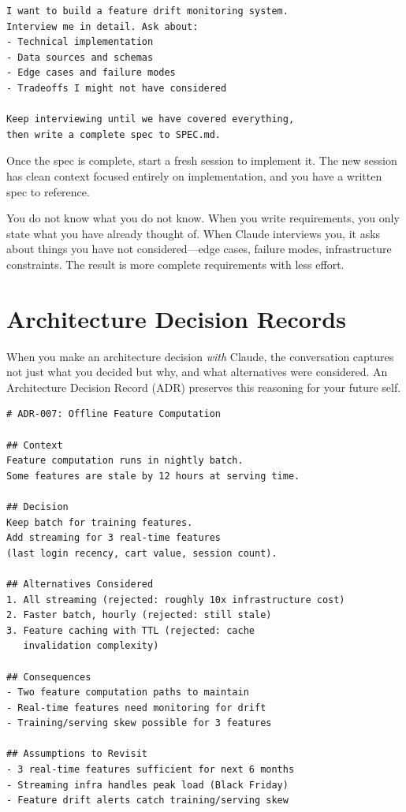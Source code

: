 
\begin{verbatim}
I want to build a feature drift monitoring system.
Interview me in detail. Ask about:
- Technical implementation
- Data sources and schemas
- Edge cases and failure modes
- Tradeoffs I might not have considered

Keep interviewing until we have covered everything,
then write a complete spec to SPEC.md.
\end{verbatim}

Once the spec is complete, start a fresh session to implement it.
The new session has clean context focused entirely on implementation,
and you have a written spec to reference.

\begin{whybox}
You do not know what you do not know. When you write requirements,
you only state what you have already thought of.
When Claude interviews you, it asks about things you have not
considered---edge cases, failure modes, infrastructure constraints.
The result is more complete requirements with less effort.
\end{whybox}

\section{Architecture Decision Records}
\label{sec:adr}

When you make an architecture decision \emph{with} Claude,
the conversation captures not just what you decided but why,
and what alternatives were considered. An Architecture Decision Record
(ADR) preserves this reasoning for your future self.

\begin{verbatim}
# ADR-007: Offline Feature Computation

## Context
Feature computation runs in nightly batch.
Some features are stale by 12 hours at serving time.

## Decision
Keep batch for training features.
Add streaming for 3 real-time features
(last login recency, cart value, session count).

## Alternatives Considered
1. All streaming (rejected: roughly 10x infrastructure cost)
2. Faster batch, hourly (rejected: still stale)
3. Feature caching with TTL (rejected: cache
   invalidation complexity)

## Consequences
- Two feature computation paths to maintain
- Real-time features need monitoring for drift
- Training/serving skew possible for 3 features

## Assumptions to Revisit
- 3 real-time features sufficient for next 6 months
- Streaming infra handles peak load (Black Friday)
- Feature drift alerts catch training/serving skew
\end{verbatim}

